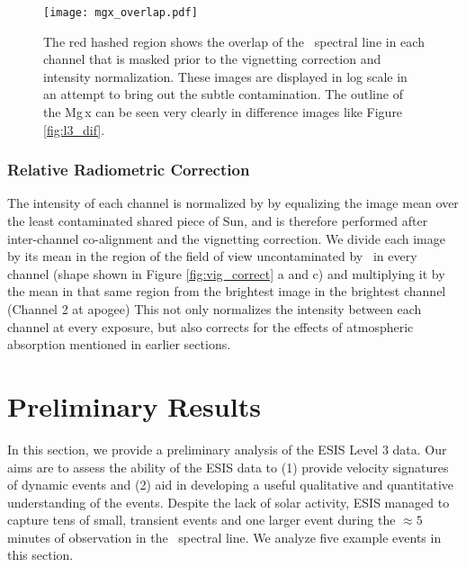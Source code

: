   
        
        \begin{figure}
        	\centering
        	\texttt{[image: mgx\_overlap.pdf]}
        	\caption{The red hashed region shows the overlap of the \mgxbright \ spectral line in each channel that is masked prior to the vignetting correction and intensity normalization. These images are displayed in log scale in an attempt to bring out the subtle contamination.  The outline of the Mg\,{\sc x} can be seen very clearly in difference images like Figure \ref{fig:l3_dif}.
        	}

        	\label{fig:mgx_overlap}
        \end{figure}
        
        

        
    \subsubsection{Relative Radiometric Correction }
        The intensity of each channel is normalized by by equalizing the image mean over the least contaminated shared piece of Sun, and is therefore performed after inter-channel co-alignment and the vignetting correction.
        We divide each image by its mean in the region of the field of view uncontaminated by \mgxbright \ in every channel (shape shown in Figure \ref{fig:vig_correct} a and c) and multiplying it by the mean in that same region from the brightest image in the brightest channel (Channel 2 at apogee)
        This not only normalizes the intensity between each channel at every exposure, but also corrects for the effects of atmospheric absorption mentioned in earlier sections. 


\section{Preliminary Results}
 
	   In this section, we provide a preliminary analysis of the ESIS Level 3 data. Our aims are to assess the ability of the ESIS data to (1) provide velocity signatures of dynamic events and (2) aid in developing a useful qualitative and quantitative understanding of the events.
	   Despite the lack of solar activity, ESIS managed to capture tens of small, transient events and one larger event during the $\approx 5$ minutes of observation in the \ov \ spectral line.  
	   We analyze five example events in this section.  
	   
